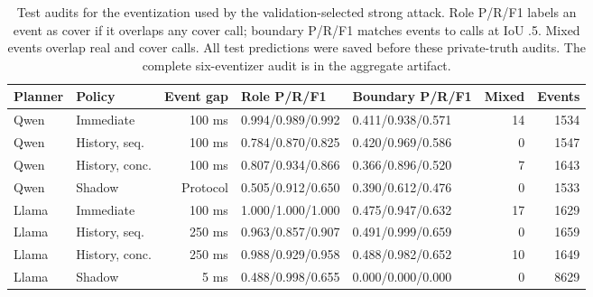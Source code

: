 \begin{table}[t]\centering\footnotesize
\caption{Test audits for the eventization used by the validation-selected strong attack. Role P/R/F1 labels an event as cover if it overlaps any cover call; boundary P/R/F1 matches events to calls at IoU .5. Mixed events overlap real and cover calls. All test predictions were saved before these private-truth audits. The complete six-eventizer audit is in the aggregate artifact.}\label{tab:supp-record-audit}
\setlength{\tabcolsep}{3pt}
\begin{tabularx}{\textwidth}{@{}llrYYrr@{}}\toprule
Planner & Policy & Event gap & Role P/R/F1 & Boundary P/R/F1 & Mixed & Events \\\midrule
Qwen & Immediate & 100 ms & 0.994/0.989/0.992 & 0.411/0.938/0.571 & 14 & 1534 \\
Qwen & History, seq. & 100 ms & 0.784/0.870/0.825 & 0.420/0.969/0.586 & 0 & 1547 \\
Qwen & History, conc. & 100 ms & 0.807/0.934/0.866 & 0.366/0.896/0.520 & 7 & 1643 \\
Qwen & Shadow & Protocol & 0.505/0.912/0.650 & 0.390/0.612/0.476 & 0 & 1533 \\
Llama & Immediate & 100 ms & 1.000/1.000/1.000 & 0.475/0.947/0.632 & 17 & 1629 \\
Llama & History, seq. & 250 ms & 0.963/0.857/0.907 & 0.491/0.999/0.659 & 0 & 1659 \\
Llama & History, conc. & 250 ms & 0.988/0.929/0.958 & 0.488/0.982/0.652 & 10 & 1649 \\
Llama & Shadow & 5 ms & 0.488/0.998/0.655 & 0.000/0.000/0.000 & 0 & 8629 \\
\bottomrule\end{tabularx}\end{table}
